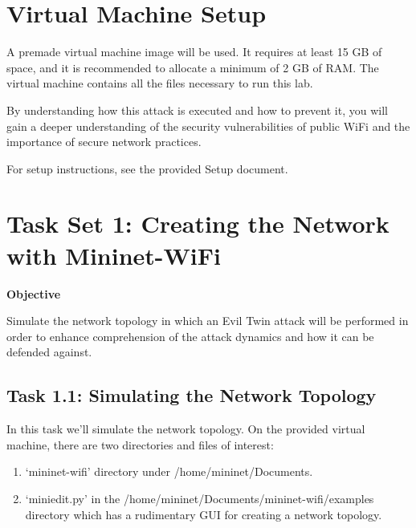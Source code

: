 \documentclass[letterpaper,12pt]{report}
\begin{document}
\section*{Virtual Machine Setup}\label{sec:Virtual-Machine-Setup}

A premade virtual machine image will be used. It requires at least 15 GB of space, and it is recommended to allocate a minimum of 2 GB of RAM. The virtual machine contains all the files necessary to run this lab.

By understanding how this attack is executed and how to prevent it, you will gain a deeper understanding of the security vulnerabilities of public WiFi and the importance of secure network practices.

For setup instructions, see the provided Setup document.


\section*{Task Set 1: Creating the Network with Mininet-WiFi}\label{sec:Task-Set-1}

\textbf{Objective}

Simulate the network topology in which an Evil Twin attack will be performed in order to enhance comprehension of the attack dynamics and how it can be defended against.

\subsection*{Task 1.1: Simulating the Network Topology}\label{sec:Task-1.1-Simulating-the-Network-Topology}

In this task we'll simulate the network topology. On the provided virtual machine, there are two directories and files of interest: 

\begin{enumerate}
    \item `mininet-wifi' directory under /home/mininet/Documents.
    \item `miniedit.py' in the /home/mininet/Documents/mininet-wifi/examples directory which has a rudimentary GUI for creating a network topology.
\end{enumerate}
\end{document}
